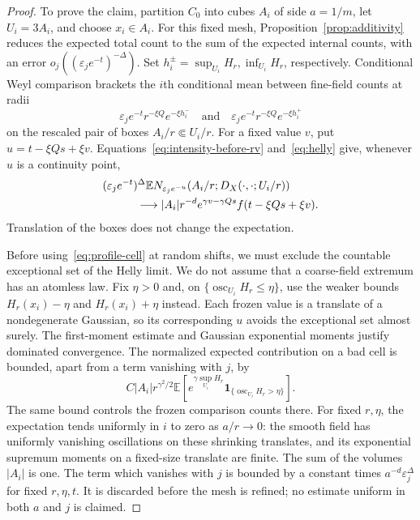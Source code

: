 \documentclass[11pt,letterpaper]{article}
\newcommand{\E}{\mathbb E}
\newcommand{\ind}{\mathbf 1}
\newcommand{\eps}{\varepsilon}
\DeclareMathOperator{\osc}{osc}
\theoremstyle{definition}
\theoremstyle{remark}
\numberwithin{equation}{section}
\begin{document}
\begin{proof}
To prove the claim, partition $C_0$ into cubes $A_i$ of side $a=1/m$, let $U_i=3A_i$, and choose $x_i\in A_i$. For this fixed mesh, Proposition~\ref{prop:additivity} reduces the expected total count to the sum of the expected internal counts, with an error $o_j((\eps_j e^{-t})^{-\Delta})$. Set $h_i^\pm=\sup_{U_i}H_r,\inf_{U_i}H_r$, respectively. Conditional Weyl comparison brackets the $i$th conditional mean between fine-field counts at radii
\begin{equation*}
 \eps_j e^{-t}r^{-\xi Q}e^{-\xi h_i^-}
 \quad\text{and}\quad
 \eps_j e^{-t}r^{-\xi Q}e^{-\xi h_i^+}
\end{equation*}
on the rescaled pair of boxes $A_i/r\Subset U_i/r$. For a fixed value $v$, put $u=t-\xi Qs+\xi v$. Equations~\eqref{eq:intensity-before-rv} and~\eqref{eq:helly} give, whenever $u$ is a continuity point,
\begin{align}\label{eq:profile-cell}
 &(\eps_j e^{-t})^\Delta
 \E N_{\eps_j e^{-u}}(A_i/r;D_X(\cdot,\cdot;U_i/r))\\
 &\hspace{3em}\longrightarrow
 |A_i|r^{-d}e^{\gamma v-\gamma Qs}
          f(t-\xi Qs+\xi v).\notag
\end{align}
Translation of the boxes does not change the expectation.

Before using~\eqref{eq:profile-cell} at random shifts, we must exclude the countable exceptional set of the Helly limit. We do not assume that a coarse-field extremum has an atomless law. Fix $\eta>0$ and, on $\{\osc_{U_i}H_r\le\eta\}$, use the weaker bounds $H_r(x_i)-\eta$ and $H_r(x_i)+\eta$ instead. Each frozen value is a translate of a nondegenerate Gaussian, so its corresponding $u$ avoids the exceptional set almost surely. The first-moment estimate and Gaussian exponential moments justify dominated convergence. The normalized expected contribution on a bad cell is bounded, apart from a term vanishing with $j$, by
\begin{equation*}
 C|A_i|r^{\gamma^2/2}
 \E\!\left[e^{\gamma\sup_{U_i}H_r}
       \ind_{\{\osc_{U_i}H_r>\eta\}}\right].
\end{equation*}
The same bound controls the frozen comparison counts there. For fixed $r,\eta$, the expectation tends uniformly in $i$ to zero as $a/r\to0$: the smooth field has uniformly vanishing oscillations on these shrinking translates, and its exponential supremum moments on a fixed-size translate are finite. The sum of the volumes $|A_i|$ is one. The term which vanishes with $j$ is bounded by a constant times $a^{-d}\eps_j^\Delta$ for fixed $r,\eta,t$. It is discarded before the mesh is refined; no estimate uniform in both $a$ and $j$ is claimed.


\end{proof}
\end{document}
